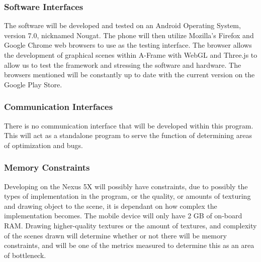 \documentclass[letterpaper,10pt,titlepage,draftclsnofoot,onecolumn,compsoc,utf8,latin1]{IEEEtran}
\begin{document}
\begin{singlespace}
\subsubsection{Software Interfaces}
\begin{singlespace}
\noindent
The software will be developed and tested on an Android Operating System, version 7.0, nicknamed Nougat. The phone will then utilize Mozilla's Firefox and Google Chrome web browsers to use as the testing interface. The browser allows the development of graphical scenes within A-Frame with WebGL and Three.js to allow us to test the framework and stressing the software and hardware. The browsers mentioned will be constantly up to date with the current version on the Google Play Store.
\end{singlespace}

\subsubsection{Communication Interfaces}
\begin{singlespace}
\noindent
There is no communication interface that will be developed within this program. This will act as a standalone program to serve the function of determining areas of optimization and bugs.
\end{singlespace}

\subsubsection{Memory Constraints}
\begin{singlespace}
\noindent
Developing on the Nexus 5X will possibly have constraints, due to possibly the types of implementation in the program, or the quality, or amounts of texturing and drawing object to the scene, it is dependant on how complex the implementation becomes. The mobile device will only have 2 GB of on-board RAM. Drawing higher-quality textures or the amount of textures, and complexity of the scenes drawn will determine whether or not there will be memory constraints, and will be one of the metrics measured to determine this as an area of bottleneck.
\end{singlespace}

\end{singlespace}
\end{document}
